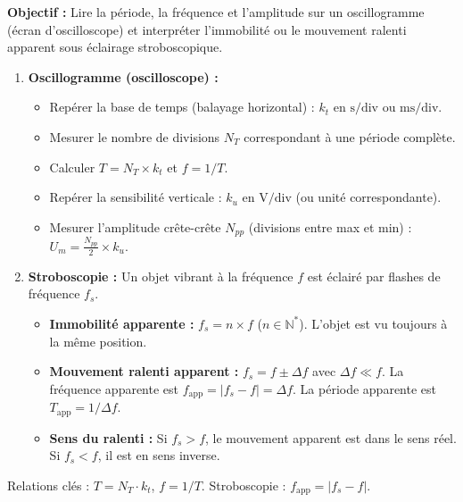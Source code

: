 \documentclass[11pt]{article}
\begin{document}
\begin{methode}
\textbf{Objectif :} Lire la période, la fréquence et l'amplitude sur un oscillogramme (écran d'oscilloscope) et interpréter l'immobilité ou le mouvement ralenti apparent sous éclairage stroboscopique.
\begin{enumerate}
    \item \textbf{Oscillogramme (oscilloscope) :}
    \begin{itemize}
        \item Repérer la base de temps (balayage horizontal) : $k_t$ en $\text{s/div}$ ou $\text{ms/div}$.
        \item Mesurer le nombre de divisions $N_T$ correspondant à une période complète.
        \item Calculer $T = N_T \times k_t$ et $f = 1/T$.
        \item Repérer la sensibilité verticale : $k_u$ en $\text{V/div}$ (ou unité correspondante).
        \item Mesurer l'amplitude crête-crête $N_{pp}$ (divisions entre max et min) : $U_{m} = \frac{N_{pp}}{2} \times k_u$.
    \end{itemize}
    \item \textbf{Stroboscopie :} Un objet vibrant à la fréquence $f$ est éclairé par flashes de fréquence $f_s$.
    \begin{itemize}
        \item \textbf{Immobilité apparente :} $f_s = n \times f$ ($n \in \mathbb{N}^*$). L'objet est vu toujours à la même position.
        \item \textbf{Mouvement ralenti apparent :} $f_s = f \pm \Delta f$ avec $\Delta f \ll f$. La fréquence apparente est $f_{\text{app}} = |f_s - f| = \Delta f$. La période apparente est $T_{\text{app}} = 1/\Delta f$.
        \item \textbf{Sens du ralenti :} Si $f_s > f$, le mouvement apparent est dans le sens réel. Si $f_s < f$, il est en sens inverse.
    \end{itemize}
\end{enumerate}
\begin{aretenir}Relations clés : $T = N_T \cdot k_t$, $f = 1/T$. Stroboscopie : $f_{\text{app}} = |f_s - f|$.\end{aretenir}
\end{methode}
\end{document}
